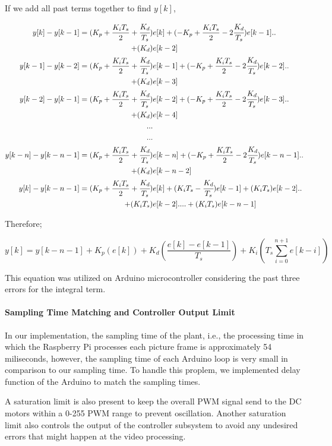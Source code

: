 \documentclass[a4paper,12pt]{article}
\begin{document}
\begin{enumerate}
	If we add all past terms together to find $y[k]$,
	
	\begin{align*}
		y[k]-y[k-1] = (K_p+\frac{K_i T_s}{2}+\cfrac{K_d}{T_s})&e[k]+(-K_p+\frac{K_i T_s}{2}-2 \cfrac{K_d}{T_s})e[k-1]..\\
		+(K_d)&e[k-2]\\
		y[k-1]-y[k-2] = (K_p+\frac{K_i T_s}{2}+\cfrac{K_d}{T_s})&e[k-1]+(-K_p+\frac{K_i T_s}{2}-2 \cfrac{K_d}{T_s})e[k-2]..\\
		+(K_d)&e[k-3] \\
		y[k-2]-y[k-1] = (K_p+\frac{K_i T_s}{2}+\cfrac{K_d}{T_s})&e[k-2]+(-K_p+\frac{K_i T_s}{2}-2 \cfrac{K_d}{T_s})e[k-3]..\\
		+(K_d)&e[k-4]\\
		...\\
		...\\
		y[k-n]-y[k-n-1] = (K_p+\frac{K_i T_s}{2}+\cfrac{K_d}{T_s})&e[k-n]+(-K_p+\frac{K_i T_s}{2}-2 \cfrac{K_d}{T_s})e[k-n-1]..\\
		+(K_d)&e[k-n-2]\\
		y[k]-y[k-n-1]= (K_p+\frac{K_i T_s}{2}+\cfrac{K_d}{T_s})&e[k] + (K_i T_s-\cfrac{K_d}{T_s})e[k-1] + (K_i T_s)e[k-2] ..\\ 
		+ (K_i T_s)&e[k-2]  .... +  (K_i T_s)e[k-n-1]
	\end{align*}
	
	Therefore;
	
	$$ 	\boxed{ y[k] = y[k-n-1]  + K_p (e[k] ) + K_d ( \frac{e[k]-e[k-1] }{T_s} )  + K_i (T_s  	 \sum_{i=0}^{n+1} e[k-i])  } $$
	
	This equation was utilized on Arduino microcontroller considering the past three errors for the integral term.
	
	
	
	\paragraph*{Sampling Time Matching and Controller Output Limit}
		
	In our implementation, the sampling time of the plant, i.e., the processing time in which the Raspberry Pi processes each picture frame is approximately 54 miliseconds, however, the sampling time of each Arduino loop is very small in comparison to our sampling time. To handle this proplem, we implemented delay function of the Arduino to match the sampling times.
	
	A saturation limit is also present to keep the overall PWM signal send to the DC motors within a 0-255 PWM range to prevent oscillation. Another saturation limit also controls the output of the controller subsystem to avoid any undesired errors that might happen at the video processing.
	

\end{enumerate}
\end{document}
